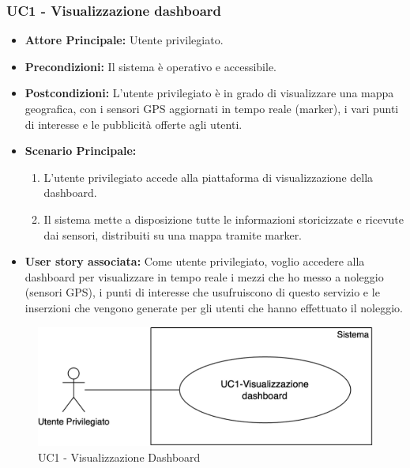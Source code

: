 \documentclass[11pt]{article}
\begin{document}
\begin{justify}
\subsubsection{\textbf{UC1 - Visualizzazione dashboard}}
\begin{itemize}
    \item \textbf{Attore Principale:} Utente privilegiato.
    \item \textbf{Precondizioni:} Il sistema è operativo e accessibile.
    \item \textbf{Postcondizioni:} L'utente privilegiato è in grado di visualizzare una mappa geografica, con i sensori GPS aggiornati in tempo reale (marker), i vari punti di interesse e le pubblicità offerte agli utenti.
    \item \textbf{Scenario Principale:}
        \begin{enumerate}
            \item L'utente privilegiato accede alla piattaforma di visualizzazione della dashboard.
            \item Il sistema mette a disposizione tutte le informazioni storicizzate e ricevute dai sensori, distribuiti su una mappa tramite marker.
        \end{enumerate}
    \item \textbf{User story associata:} Come utente privilegiato, voglio accedere alla dashboard per visualizzare in tempo reale i mezzi che ho messo a noleggio (sensori GPS), i punti di interesse che usufruiscono di questo servizio e le inserzioni che vengono generate per gli utenti che hanno effettuato il noleggio.
\end{itemize}
\begin{figure}[H]
    \centering
    \includegraphics[width=0.5\linewidth]{UC1image.png}
    \caption{UC1 - Visualizzazione Dashboard}
    \label{fig:UC1}
\end{figure}

\end{justify}
\end{document}
